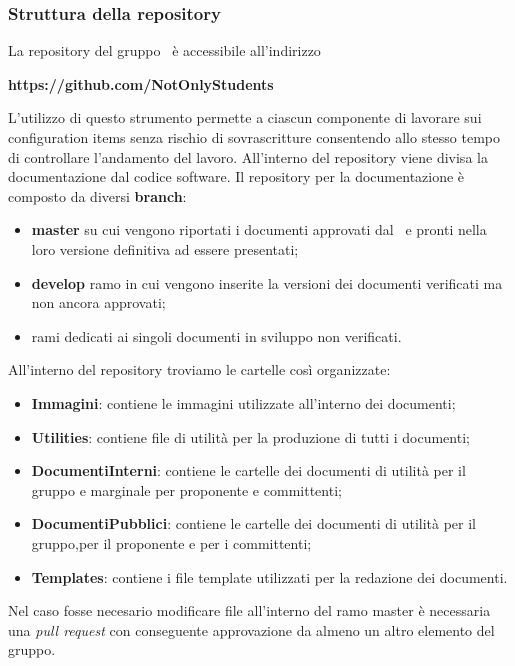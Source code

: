 \subsubsection{Struttura della repository}
La repository del gruppo \Gruppo\ è accessibile all'indirizzo
\begin{center}
	\textbf{https://github.com/NotOnlyStudents}
\end{center}
L'utilizzo di questo strumento permette a ciascun componente di lavorare sui configuration items senza rischio di sovrascritture consentendo allo stesso tempo di controllare l'andamento del lavoro. 
All'interno del repository viene divisa la documentazione dal codice software.
Il repository per la documentazione è composto da diversi \textbf{branch}:
\begin{itemize}
	\item \textbf{master} su cui vengono riportati i documenti approvati dal \Responsabile\ e pronti nella loro versione definitiva ad essere presentati;
	\item \textbf{develop} ramo in cui vengono inserite la versioni dei documenti verificati ma non ancora approvati;
	\item rami dedicati ai singoli documenti in sviluppo non verificati.
\end{itemize}
All'interno del repository troviamo le cartelle così organizzate:
\begin{itemize}
	\item \textbf{Immagini}: contiene le immagini utilizzate all'interno dei documenti;
	\item \textbf{Utilities}: contiene file di utilità per la produzione di tutti i documenti;
	\item \textbf{DocumentiInterni}: contiene le cartelle dei documenti di utilità per il gruppo e marginale per proponente e committenti;
	\item \textbf{DocumentiPubblici}: contiene le cartelle dei documenti di utilità per il gruppo,per il proponente e per i committenti;
	\item \textbf{Templates}: contiene i file template utilizzati per la redazione dei documenti.
\end{itemize}
\label{ModificaRepo}
Nel caso fosse necesario modificare file all'interno del ramo master è necessaria una \textit{pull request} con conseguente approvazione da almeno un altro elemento del gruppo.